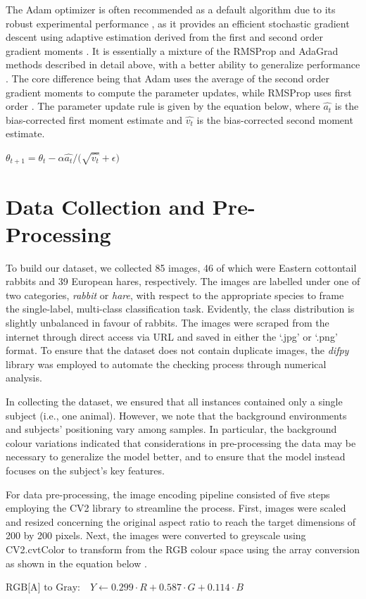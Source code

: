 \documentclass{article}
\begin{document}
The Adam optimizer is often recommended as a default algorithm due to its robust experimental performance \cite{cs231n}, as it provides an efficient stochastic gradient descent using adaptive estimation derived from the first and second order gradient moments \cite{cs231n}. It is essentially a mixture of the RMSProp and AdaGrad methods described in detail above, with a better ability to generalize performance \cite{cs231n,ajagekar_2021}. The core difference being that Adam uses the average of the second order gradient moments to compute the parameter updates, while RMSProp uses first order \cite{ajagekar_2021}. The parameter update rule is given by the equation below, where $\hat{a_t}$ is the bias-corrected first moment estimate and $\hat{v_t}$ is the bias-corrected second moment estimate.
\newline
\newline
\centerline{$\theta_{t+1} = \theta_t - {{\alpha}\hat{a_t}/(\sqrt{\hat{v_t}} + \epsilon}) $ \cite{kingma2014adam}}


\section{Data Collection and Pre-Processing}
To build our dataset, we collected 85 images, 46 of which were Eastern cottontail rabbits and 39 European hares, respectively. The images are labelled under one of two categories, \emph{rabbit} or \emph{hare}, with respect to the appropriate species to frame the single-label, multi-class classification task. Evidently, the class distribution is slightly unbalanced in favour of rabbits. The images were scraped from the internet through direct access via URL and saved in either the ‘.jpg’ or ‘.png’ format. To ensure that the dataset does not contain duplicate images, the \emph{difpy} \cite{landman} library was employed to automate the checking process through numerical analysis.

In collecting the dataset, we ensured that all instances contained only a single subject (i.e., one animal). However, we note that the background environments and subjects’ positioning vary among samples. In particular, the background colour variations indicated that considerations in pre-processing the data may be necessary to generalize the model better, and to ensure that the model instead focuses on the subject’s key features. 

For data pre-processing, the image encoding pipeline consisted of five steps employing the CV2 library \cite{opencv_library} to streamline the process. First, images were scaled and resized concerning the original aspect ratio to reach the target dimensions of 200 by 200 pixels. Next, the images were converted to greyscale using CV2.cvtColor to transform from the RGB colour space using the array conversion as shown in the equation below \cite{opencv_library}. 
\newline
\newline
\centerline{$\text{RGB[A] to Gray:} \quad Y \leftarrow 0.299 \cdot R + 0.587 \cdot G + 0.114 \cdot B$ \cite{opencv_library}}
\end{document}
